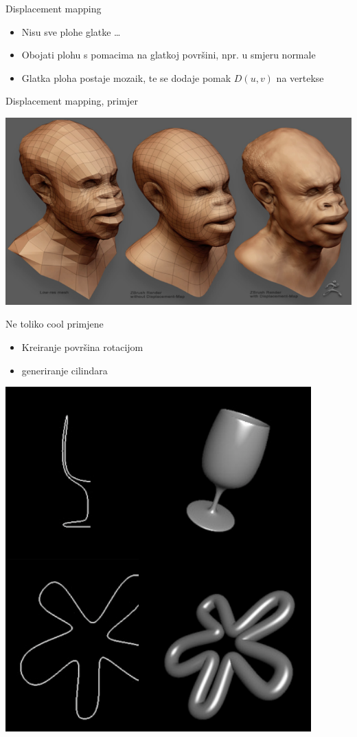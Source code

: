 \documentclass[9pt]{beamer}
\begin{document}
\begin{frame}{Displacement mapping}
	\begin{itemize}
		\item<1-> Nisu sve plohe glatke \ldots
		\item<1-> Obojati plohu s pomacima na glatkoj površini, npr. u smjeru normale
		\item<3-> Glatka ploha postaje mozaik, te se dodaje pomak $D(u,v)$ na vertekse
	\end{itemize}
\end{frame}
\begin{frame}{Displacement mapping, primjer}
	\begin{center}
		\includegraphics[height=6.cm]{./slike/covjek_displacement.png}
	\end{center}
\end{frame}
\begin{frame}{Ne toliko cool primjene}
	\begin{itemize}
		\item Kreiranje površina rotacijom
		\item generiranje cilindara
	\end{itemize}
	\begin{center}
		\includegraphics[height=4.cm]{./slike/surface_revolution.png}
	\end{center}
\end{frame}
\end{document}
